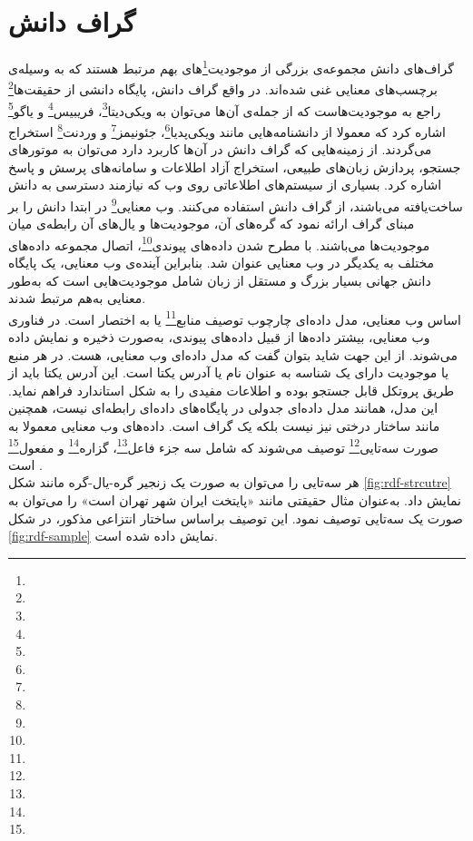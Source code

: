 \section{گراف دانش}
گراف‌های دانش مجموعه‌ی بزرگی از موجودیت‌\footnote{}های بهم مرتبط هستند که به وسیله‌ی برچسب‌های معنایی غنی شده‌اند. در واقع گراف دانش، پایگاه دانشی از حقیقت‌ها\footnote{} راجع به موجودیت‌هاست که از جمله‌ی آن‌ها می‌توان به ویکی‌دیتا\footnote{}، فریبیس\footnote{} و یاگو\footnote{} اشاره کرد که معمولا از دانشنامه‌هایی مانند ویکی‌پدیا\footnote{}، جئونیمز\footnote{} و وردنت\footnote{} استخراج می‌گردند. از زمینه‌هایی که گراف دانش در آن‌ها کاربرد دارد می‌توان به موتورهای جستجو، پردازش زبان‌های طبیعی، استخراج آزاد اطلاعات و سامانه‌های پرسش و پاسخ اشاره کرد. بسیاری از سیستم‌های اطلاعاتی روی وب که نیازمند دسترسی به دانش ساخت‌یافته می‌باشند، از گراف دانش استفاده می‌کنند. وب معنایی\footnote{} در ابتدا دانش را بر مبنای گراف ارائه نمود که گره‌های آن، موجودیت‌ها و یال‌های آن رابطه‌ی میان موجودیت‌ها می‌باشند. با مطرح شدن داده‌های پیوندی\footnote{}، اتصال مجموعه داده‌های مختلف به یکدیگر در وب معنایی عنوان شد. بنابراین آینده‌ی وب معنایی، یک پایگاه دانش جهانی بسیار بزرگ و مستقل از زبان شامل موجودیت‌هایی است که به‌طور معنایی به‌هم مرتبط شدند.\\
اساس وب معنایی، مدل داده‌ای چارچوب توصیف منابع\footnote{} یا به اختصار  است. در فناوری وب معنایی، بیشتر داده‌ها از قبیل داده‌های پیوندی، به‌صورت  ذخیره و نمایش داده می‌شوند. از این جهت شاید بتوان گفت که مدل داده‌ای وب معنایی،  هست. در  هر منبع یا موجودیت دارای یک شناسه به‌ عنوان نام یا آدرس یکتا است. این آدرس یکتا باید از طریق پروتکل  قابل جستجو بوده و اطلاعات مفیدی را به شکل استاندارد فراهم نماید. این مدل، همانند مدل داده‌ای جدولی در پایگاه‌های داده‌ای رابطه‌ای نیست، همچنین مانند ساختار درختی  نیز نیست بلکه  یک گراف است. داده‌های وب معنایی معمولا به صورت سه‌تایی\footnote{} توصیف می‌شوند که شامل سه جزء فاعل\footnote{}، گزاره\footnote{} و مفعول\footnote{} است \cite{persian_graph}.\\
هر سه‌تایی را می‌توان به ‌صورت یک زنجیر گره-یال-گره مانند شکل \ref{fig:rdf-strcutre} نمایش داد. به‌عنوان مثال حقیقتی مانند «پایتخت ایران شهر تهران است» را می‌توان به ‌صورت یک سه‌‌تایی توصیف نمود. این توصیف براساس ساختار انتزاعی مذکور، در شکل ‌\ref{fig:rdf-sample} نمایش داده شده‌ است.

